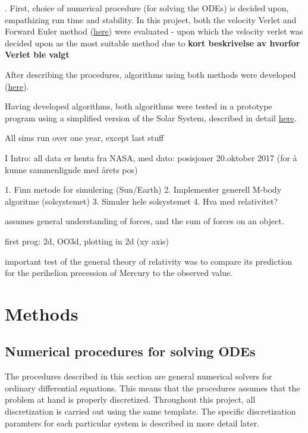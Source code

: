 \documentclass[%
oneside,                 %
final,                   %
10pt]{article}
\begin{document}
. \newline
First, choice of numerical procedure (for solving the ODEs) is decided upon, empathizing run time and stability. In this project, both the velocity Verlet and Forward Euler method (\hyperref[sec:NPs]{here}) were evaluated - upon which the velocity verlet was decided upon as the most suitable method due to \textbf{kort beskrivelse av hvorfor Verlet ble valgt}\newline

After describing the procedures, algorithms using both methods were developed (\hyperref[sec:NPalgo]{here}). \newline

Having developed algorithms, both algorithms were tested in a prototype program using a simplified version of the Solar System, described in detail \hyperref[sec:NPalgo]{here}.


All sims run over one year, except last stuff

I Intro: all data er henta fra NASA, med dato: posisjoner 20.oktober 2017 (for å kunne sammenlignde med årets pos)


1. Finn metode for simulering (Sun/Earth)
2. Implementer generell M-body algoritme (solsystemet)
3. Simuler hele solsystemet
4. Hva med relativitet?

assumes general understanding of forces, and the sum of forces on an object.

first prog: 2d, OO3d, plotting in 2d (xy axis)

 important test
of the general theory of relativity was to compare its prediction for the perihelion
precession of Mercury to the observed value.

\section{Methods}

\subsection{Numerical procedures for solving ODEs}
\label{sec:NPs}
The procedures \cite{HJ-ODE} described in this section are general numerical solvers for ordinary differential equations. This means that the procedures assumes that the problem at hand is properly discretized.  Throughout this project, all discretization is carried out using the same template. The specific discretization paramters for each particular system is described in more detail later.  \newline
\end{document}
